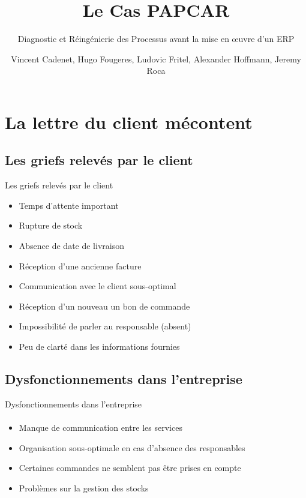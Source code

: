 \documentclass{beamer}
\title{Le Cas PAPCAR} %
\subtitle{Diagnostic et Réingénierie des Processus avant la mise en œuvre d’un ERP} %
\author{Vincent Cadenet, Hugo Fougeres, Ludovic Fritel, Alexander Hoffmann, Jeremy Roca}
\begin{document}
  \frame{\maketitle}


    \section{La lettre du client mécontent}
    \subsection{Les griefs relevés par le client}
    \begin{frame}{Les griefs relevés par le client}
      \begin{itemize}
      	\item Temps d’attente important
		\item Rupture de stock
		\item Absence de date de livraison
		\item Réception d’une ancienne facture
		\item Communication avec le client sous-optimal
		\item Réception d’un nouveau un bon de commande
		\item Impossibilité de parler au responsable (absent)
		\item Peu de clarté dans les informations fournies
      \end{itemize}
    \end{frame}

	\subsection{Dysfonctionnements dans l'entreprise}
    \begin{frame}[label=lists]{Dysfonctionnements dans l'entreprise}
      \framesubtitle{}
      \begin{itemize}
      	\item Manque de communication entre les services
      	\item Organisation sous-optimale en cas d'absence des responsables
      	\item Certaines commandes ne semblent pas être prises en compte
      	\item Problèmes sur la gestion des stocks
      \end{itemize}
    \end{frame}
    
\end{document}
